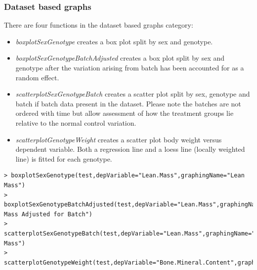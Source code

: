 \documentclass[12pt,a4paper]{article}
\begin{document}
\subsubsection{Dataset based graphs}
There are four functions in the dataset based graphs category:
\begin{itemize}
\item \textit{boxplotSexGenotype} creates a box plot split by sex and genotype.
\item \textit{boxplotSexGenotypeBatchAdjusted} creates a box plot split by sex and genotype after the variation arising from batch has been accounted for as a random effect.
\item \textit{scatterplotSexGenotypeBatch} creates a scatter plot split by sex, genotype and batch if batch data present in the dataset. Please note the batches are not ordered with time but allow assessment of how the treatment groups lie relative to the normal control variation.
\item \textit{scatterplotGenotypeWeight} creates a scatter plot body weight versus dependent variable. Both a regression line and a loess line (locally weighted line) is fitted for each genotype. 
\end{itemize}

\begingroup
\fontsize{8pt}{12pt}\selectfont
\begin{verbatim}
> boxplotSexGenotype(test,depVariable="Lean.Mass",graphingName="Lean Mass")
> boxplotSexGenotypeBatchAdjusted(test,depVariable="Lean.Mass",graphingName="Lean Mass Adjusted for Batch")
> scatterplotSexGenotypeBatch(test,depVariable="Lean.Mass",graphingName="Lean Mass")
> scatterplotGenotypeWeight(test,depVariable="Bone.Mineral.Content",graphingName="BMC")
\end{verbatim}
\endgroup 
\end{document}
